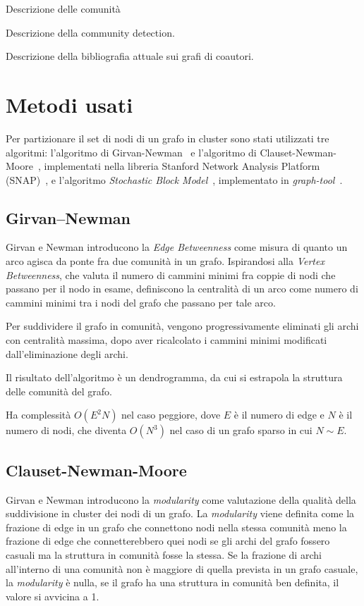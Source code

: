 \documentclass[12pt,a4paper,twoside]{report}
\begin{document}
Descrizione delle comunità


Descrizione della community detection.

Descrizione della bibliografia attuale sui grafi di coautori.

\section{Metodi usati} \label{sec:metodi}

Per partizionare il set di nodi di un grafo in cluster sono stati utilizzati tre algoritmi:
l'algoritmo di Girvan-Newman~\cite{Girvan7821} e l'algoritmo di
Clauset-Newman-Moore~\cite{2004PhRvE..70f6111C}, implementati nella libreria Stanford Network
Analysis Platform (SNAP)~\cite{snapnets}, e l'algoritmo \textit{Stochastic Block
Model}~\cite{2014PhRvE..89a2804P}, implementato in
\textit{graph-tool}~\cite{peixoto_graph-tool_2014}.

\subsection{Girvan–Newman} \label{subsec:gn}
Girvan e Newman introducono la \textit{Edge Betweenness} come misura di quanto un arco agisca da
ponte fra due comunità in un grafo. Ispirandosi alla \textit{Vertex Betweenness}, che valuta il
numero di cammini minimi fra coppie di nodi che passano per il nodo in esame, definiscono la
centralità di un arco come numero di cammini minimi tra i nodi del grafo che passano per tale arco.

Per suddividere il grafo in comunità, vengono progressivamente eliminati gli archi con centralità
massima, dopo aver ricalcolato i cammini minimi modificati dall'eliminazione degli archi.

Il risultato dell'algoritmo è un dendrogramma, da cui si estrapola la struttura delle comunità del
grafo.

Ha complessità $O(E^2N)$ nel caso peggiore, dove $E$ è il numero di edge e $N$ è il numero di nodi,
che diventa $O(N^3)$ nel caso di un grafo sparso in cui $N\sim E$.

\subsection{Clauset-Newman-Moore} \label{subsec:cnm}

Girvan e Newman introducono la \textit{modularity} \cite{2004phrve..69b6113n} come valutazione della
qualità della suddivisione in cluster dei nodi di un grafo. La \textit{modularity} viene definita
come la frazione di edge in un grafo che connettono nodi nella stessa comunità meno la frazione di
edge che connetterebbero quei nodi se gli archi del grafo fossero casuali ma la struttura in
comunità fosse la stessa. Se la frazione di archi all'interno di una comunità non è maggiore di
quella prevista in un grafo casuale, la \textit{modularity} è nulla, se il grafo ha una struttura in
comunità ben definita, il valore si avvicina a 1.
\end{document}
